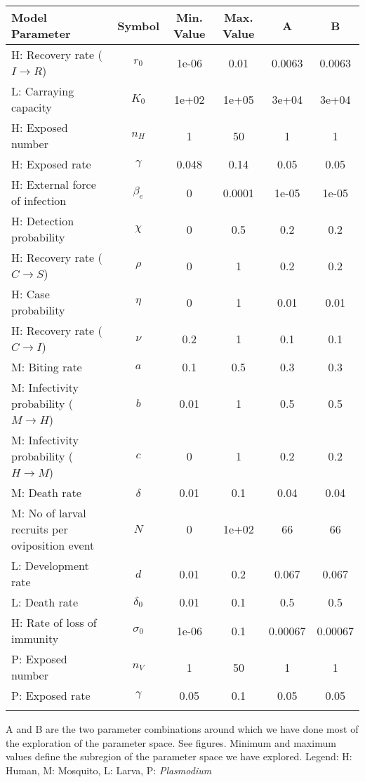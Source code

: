 \begin{table}
\noindent
\begin{tabular}{p{5cm}ccccc}
{\bf Model Parameter} & {\bf Symbol} & {\bf Min. Value} & {\bf Max. Value} & {\bf A} & {\bf B}\\
\hline\hline
  H: Recovery rate ($I \rightarrow R$) & $r_0$ & 1e-06 & 0.01 & 0.0063 & 0.0063\\
  L: Carraying capacity & $K_0$ & 1e+02 & 1e+05 & 3e+04 & 3e+04\\
  H: Exposed number & $n_H$ &    1 &   50 &    1 &    1\\
  H: Exposed rate & $\gamma$ & 0.048 & 0.14 & 0.05 & 0.05\\
  H: External force of infection & $\beta_e$ &    0 & 0.0001 & 1e-05 & 1e-05\\
  H: Detection probability & $\chi$ &    0 &  0.5 &  0.2 &  0.2\\
  H: Recovery rate ($C \rightarrow S$) & $\rho$ &    0 &    1 &  0.2 &  0.2\\
  H: Case probability & $\eta$ &    0 &    1 & 0.01 & 0.01\\
  H: Recovery rate ($C \rightarrow I$) & $\nu$ &  0.2 &    1 &  0.1 &  0.1\\
  M: Biting rate & $a$ &  0.1 &  0.5 &  0.3 &  0.3\\
  M: Infectivity probability ($M \rightarrow H$) & $b$ & 0.01 &    1 &  0.5 &  0.5\\
  M: Infectivity probability ($H \rightarrow M$) & $c$ &    0 &    1 &  0.2 &  0.2\\
  M: Death rate & $\delta$ & 0.01 &  0.1 & 0.04 & 0.04\\
  M: No of larval recruits per oviposition event & $N$ &    0 & 1e+02 &   66 &   66\\
  L: Development rate & $d$ & 0.01 &  0.2 & 0.067 & 0.067\\
  L: Death rate & $\delta_0$ & 0.01 &  0.1 &  0.5 &  0.5\\
  H: Rate of loss of immunity & $\sigma_0$ & 1e-06 &  0.1 & 0.00067 & 0.00067\\
  P: Exposed number & $n_V$ &    1 &   50 &    1 &    1\\
  P: Exposed rate & $\gamma$ & 0.05 &  0.1 & 0.05 & 0.05\\
\hline\hline
\smallskip
\end{tabular}
 A and B are the two parameter combinations around which we have done most of the exploration of the parameter space. See figures. Minimum and maximum values define the subregion of the parameter space we have explored. Legend: {\small H: Human, M: Mosquito, L: Larva, P: {\em Plasmodium}} 
\end{table}
